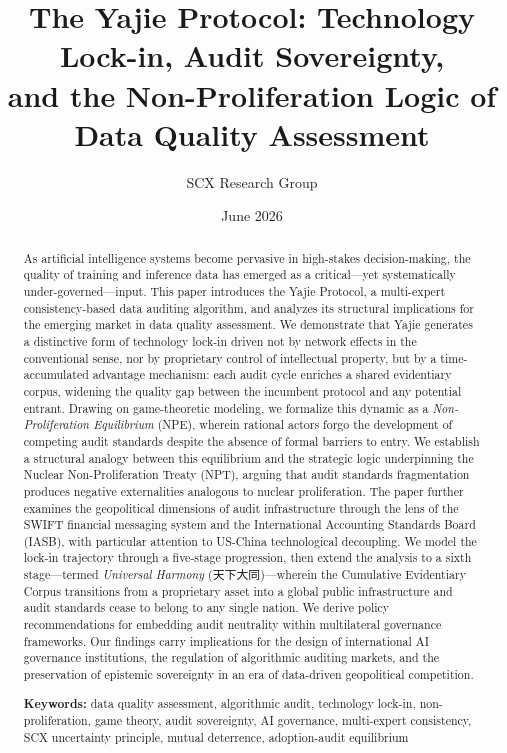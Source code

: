 \documentclass[12pt,a4paper]{ctexart}
\title{The Yajie Protocol: Technology Lock-in, Audit Sovereignty,\\and the Non-Proliferation Logic of Data Quality Assessment}
\author{SCX Research Group}
\date{June 2026}
\theoremstyle{definition}
\theoremstyle{remark}
\begin{document}
\maketitle

\begin{abstract}
As artificial intelligence systems become pervasive in high-stakes decision-making, the quality of training and inference data has emerged as a critical—yet systematically under-governed—input. This paper introduces the Yajie Protocol, a multi-expert consistency-based data auditing algorithm, and analyzes its structural implications for the emerging market in data quality assessment. We demonstrate that Yajie generates a distinctive form of technology lock-in driven not by network effects in the conventional sense, nor by proprietary control of intellectual property, but by a time-accumulated advantage mechanism: each audit cycle enriches a shared evidentiary corpus, widening the quality gap between the incumbent protocol and any potential entrant. Drawing on game-theoretic modeling, we formalize this dynamic as a \textit{Non-Proliferation Equilibrium} (NPE), wherein rational actors forgo the development of competing audit standards despite the absence of formal barriers to entry. We establish a structural analogy between this equilibrium and the strategic logic underpinning the Nuclear Non-Proliferation Treaty (NPT), arguing that audit standards fragmentation produces negative externalities analogous to nuclear proliferation. The paper further examines the geopolitical dimensions of audit infrastructure through the lens of the SWIFT financial messaging system and the International Accounting Standards Board (IASB), with particular attention to US-China technological decoupling. We model the lock-in trajectory through a five-stage progression, then extend the analysis to a sixth stage—termed \textit{Universal Harmony} (天下大同)—wherein the Cumulative Evidentiary Corpus transitions from a proprietary asset into a global public infrastructure and audit standards cease to belong to any single nation. We derive policy recommendations for embedding audit neutrality within multilateral governance frameworks. Our findings carry implications for the design of international AI governance institutions, the regulation of algorithmic auditing markets, and the preservation of epistemic sovereignty in an era of data-driven geopolitical competition.

\bigskip
\noindent\textbf{Keywords:} data quality assessment, algorithmic audit, technology lock-in, non-proliferation, game theory, audit sovereignty, AI governance, multi-expert consistency, SCX uncertainty principle, mutual deterrence, adoption-audit equilibrium
\end{abstract}
\end{document}
